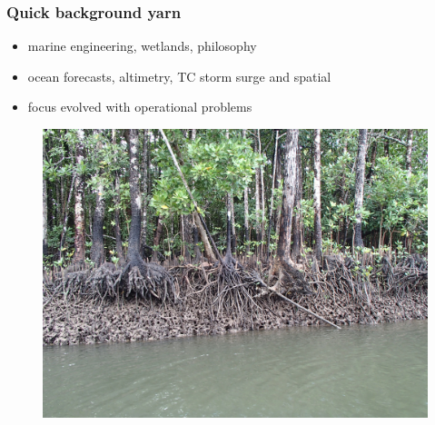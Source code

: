 \begin{frame}
\frametitle{Quick background yarn}
\begin{minipage}{1.0\textwidth}
\begin{itemize}
    \item marine engineering, wetlands, philosophy
    \item ocean forecasts, altimetry, TC storm surge and spatial
    \item focus evolved with operational problems
\end{itemize}   
\end{minipage}

\vspace{0.5cm}
\begin{minipage}{1.0\textwidth}
    \begin{figure}      
    \includegraphics[trim={0 5cm 0 6cm},clip,width=\textwidth]{figures/images/mangrove.jpeg}
    \end{figure}
\end{minipage}

\end{frame}